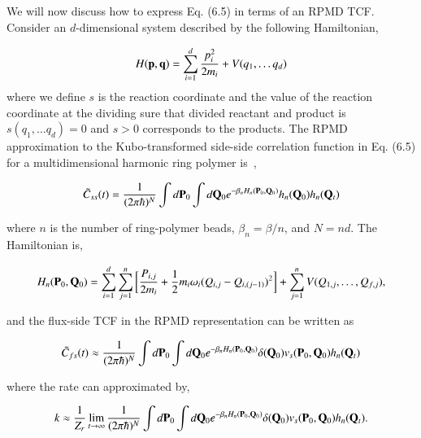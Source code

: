 \documentclass[phd,tocprelim]{cornell}
\begin{document}
We will now discuss how to express Eq. (6.5) in terms of an RPMD TCF.
Consider an $d$-dimensional system described by the following Hamiltonian,

\begin{equation}
H({\bf{p}},{\bf{q}}) = \sum_{i=1}^{d} \frac{p_i^2}{2m_i} + V(q_1, \dots q_d)
\end{equation}
where we define $s$ is the reaction coordinate and the value of the reaction coordinate at the dividing sure that divided reactant and product is $s(q_1, \dots q_d)=0$ and $s>0$ corresponds to the products. The RPMD approximation to the Kubo-transformed side-side correlation function in Eq. (6.5)  for a multidimensional harmonic ring polymer  is~\cite{CHANDLER1981}, 

\begin{equation} 
\tilde{C}_{ss}(t) = \frac{1}{(2\pi \hbar)^N} \int d{\bf{P}}_0  \int d{\bf{Q}}_0 e^{-\beta_n H_n({\bf{P}}_0,{\bf{Q}}_0)} h_n({\bf{Q}}_0)h_n({\bf{Q}}_t)
\end{equation}

where $n$ is the number of ring-polymer beads, $\beta_n = \beta/n$, and $N=nd$. The Hamiltonian is, 

\begin{equation}
H_n({\bf{P}}_0,{\bf{Q}}_0)= \sum_{i=1}^d \sum_{j=1}^n \bigg[ \frac{P_{i,j}}{2m_i} + \frac{1}{2} m_i \omega_i ( Q_{i,j} - Q_{i, (j-1)})^2\bigg] \\
+ \sum_{j=1}^{n} V(Q_{1,j}, \dots, Q_{f,j}),
\end{equation}

and the flux-side TCF in the RPMD representation can be written as 

\begin{equation} 
\tilde{C}_{fs}(t) \approx \frac{1}{(2\pi \hbar)^N} \int d{\bf{P}}_0  \int d{\bf{Q}}_0 e^{-\beta_n H_n({\bf{P}}_0,{\bf{Q}}_0)} \delta ({\bf{Q}}_0)v_s({\bf{P}}_0,{\bf{Q}}_0)h_n({\bf{Q}}_t)
\end{equation}

where the rate can approximated by, 

 \begin{equation}
 k \approx \frac{1}{Z_r} \lim_{t\to \infty} \frac{1}{(2\pi \hbar)^N} \int d{\bf{P}}_0  \int d{\bf{Q}}_0 e^{-\beta_n H_n({\bf{P}}_0,{\bf{Q}}_0)} \delta ({\bf{Q}}_0)v_s({\bf{P}}_0,{\bf{Q}}_0)h_n({\bf{Q}}_t).
 \end{equation}
 
\end{document}
